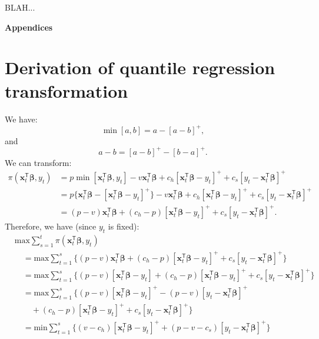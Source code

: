 \documentclass{article}
\begin{document}
BLAH...

\printbibliography

\newpage
\begin{center}
{\bf\Large Appendices}
\end{center}

\appendix





\section{Derivation of quantile regression transformation}\label{app:A}
We have:
\[
    \min[a,b]=a-[a-b]^+,
\]
and
\[
    a-b=[a-b]^+-[b-a]^+.
\]
We can transform:
\[
    \begin{aligned}
        \pi(\mathbf{x}_t^{\mathsf{T}}\boldsymbol{\beta},y_t)
        &=p\min[\mathbf{x}_t^{\mathsf{T}}\boldsymbol{\beta},y_t]-v\mathbf{x}_t^{\mathsf{T}}\boldsymbol{\beta}+c_h[\mathbf{x}_t^{\mathsf{T}}\boldsymbol{\beta}-y_t]^++c_s[y_t-\mathbf{x}_t^{\mathsf{T}}\boldsymbol{\beta}]^+\\
        &=p\{\mathbf{x}_t^{\mathsf{T}}\boldsymbol{\beta}-[\mathbf{x}_t^{\mathsf{T}}\boldsymbol{\beta}-y_t]^+\}-v\mathbf{x}_t^{\mathsf{T}}\boldsymbol{\beta}+c_h[\mathbf{x}_t^{\mathsf{T}}\boldsymbol{\beta}-y_t]^++c_s[y_t-\mathbf{x}_t^{\mathsf{T}}\boldsymbol{\beta}]^+\\
        &=(p-v)\mathbf{x}_t^{\mathsf{T}}\boldsymbol{\beta}+(c_h-p)[\mathbf{x}_t^{\mathsf{T}}\boldsymbol{\beta}-y_t]^++c_s[y_t-\mathbf{x}_t^{\mathsf{T}}\boldsymbol{\beta}]^+.
    \end{aligned}
\]
Therefore, we have (since $y_t$ is fixed):
\[
    \begin{aligned}
        &\text{max}\displaystyle\sum_{s=1}^t{\pi(\mathbf{x}_t^{\mathsf{T}}\boldsymbol{\beta},y_t)}\\
        &\quad=\text{max}\displaystyle\sum_{t=1}^s\{(p-v)\mathbf{x}_t^{\mathsf{T}}\boldsymbol{\beta}+(c_h-p)[\mathbf{x}_t^{\mathsf{T}}\boldsymbol{\beta}-y_t]^++c_s[y_t-\mathbf{x}_t^{\mathsf{T}}\boldsymbol{\beta}]^+\}\\
        &\quad=\text{max}\displaystyle\sum_{t=1}^s\{(p-v)[\mathbf{x}_t^{\mathsf{T}}\boldsymbol{\beta}-y_t]+(c_h-p)[\mathbf{x}_t^{\mathsf{T}}\boldsymbol{\beta}-y_t]^++c_s[y_t-\mathbf{x}_t^{\mathsf{T}}\boldsymbol{\beta}]^+\}\\
        &\quad=\text{max}\displaystyle\sum_{t=1}^s\{(p-v)[\mathbf{x}_t^{\mathsf{T}}\boldsymbol{\beta}-y_t]^+-(p-v)[y_t-\mathbf{x}_t^{\mathsf{T}}\boldsymbol{\beta}]^+\\
        &\qquad+(c_h-p)[\mathbf{x}_t^{\mathsf{T}}\boldsymbol{\beta}-y_t]^++c_s[y_t-\mathbf{x}_t^{\mathsf{T}}\boldsymbol{\beta}]^+\}\\
        &\quad=\text{min}\displaystyle\sum_{t=1}^s\{(v-c_h)[\mathbf{x}_t^{\mathsf{T}}\boldsymbol{\beta}-y_t]^++(p-v-c_s)[y_t-\mathbf{x}_t^{\mathsf{T}}\boldsymbol{\beta}]^+\}
    \end{aligned}
\]
\end{document}
